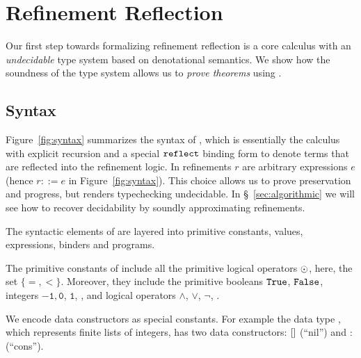 \section{Refinement Reflection}
\label{sec:formalism}
\label{sec:types-reflection}

Our first step towards formalizing refinement
reflection is a core calculus \corelan with an
\emph{undecidable} type system based on
denotational semantics.
We show how the soundness of the type system
allows us to \emph{prove theorems} using \corelan.

%

\subsection{Syntax}

%
Figure~\ref{fig:syntax} summarizes the syntax of \corelan,
which is essentially the calculus \undeclang~\cite{Vazou14}
with explicit recursion and a special $\mathtt{reflect}$ binding form
to denote terms that are reflected into the refinement logic.
%
In \corelan refinements $r$ are arbitrary expressions $e$
(hence $r ::= e$ in Figure~\ref{fig:syntax}).
%
This choice allows us to prove preservation and progress,
but renders typechecking undecidable.
%
In \S~\ref{sec:algorithmic} we will see how to recover
decidability by soundly approximating refinements.

The syntactic elements of \corelan are layered into
primitive constants, values, expressions, binders
and programs.

The primitive constants of \corelan
include all the primitive logical
operators $\odot$, here, the set $\{ =, <\}$.
%
Moreover, they include the
primitive booleans $\mathtt{True}$, $\mathtt{False}$,
integers $\mathtt{-1}, \mathtt{0}$, $\mathtt{1}$, \etc,
and logical operators $\mathtt{\land}$, $\mathtt{\lor}$, $\mathtt{\lnot}$, \etc.

%
We encode data constructors as special constants.
For example the data type \tintlist, which represents
finite lists of integers, has two data constructors: $[]$ (``nil'')
and $:$ (``cons'').

